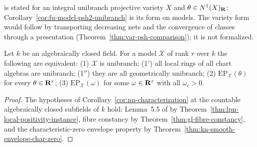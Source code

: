 \cite[Corollary~8.4]{FHX} is stated for an integral unibranch projective variety
$X$ and $\theta\in N^1(X)_{\mathbf{R}}$; Corollary~\ref{cor:fu-model-psh2-unibranch} is its
form on models. The variety form would follow by transporting decreasing nets and
the convergence of classes through a presentation
(Theorem~\ref{thm:var-psh-comparison}); it is not formalized.

\begin{corollary}
\label{cor:fu-model-characterization}
\leanok
Let $k$ be an algebraically closed field. For a model $\mathcal X$ of
rank $r$ over $k$ the following are equivalent: (1) $\mathcal X$ is unibranch;
(1$'$) all local rings of all chart algebras are unibranch; (1$''$) they are
all geometrically unibranch; (2) $\mathrm{EP}_{\mathcal X}(\theta)$ for every
$\theta\in\mathbf{R}^r$; (3) $\mathrm{EP}_{\mathcal X}(\omega)$ for some $\omega\in\mathbf{R}^r$
with all $\omega_c>0$.
\end{corollary}
\begin{proof}
The hypotheses of Corollary~\ref{cor:nn-characterization} at the countable
algebraically closed subfields of $k$ hold: Lemma~5.5 of \cite{FHX} by
Theorem~\ref{thm:lpn-local-positivity-instance}, fibre constancy by
Theorem~\ref{thm:gl-fibre-constancy}, and the characteristic-zero envelope
property by Theorem~\ref{thm:kn-smooth-envelope-char-zero}.
\end{proof}
